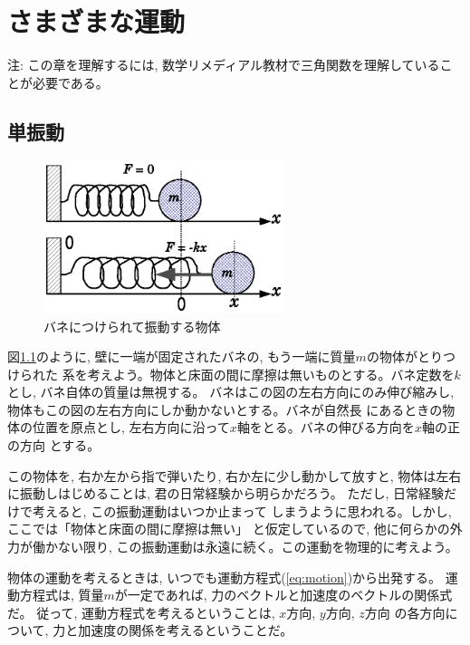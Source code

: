 \chapter{さまざまな運動}

注: この章を理解するには, 数学リメディアル教材で三角関数を理解していることが必要である。\mv

\section{単振動}
\begin{figure}[h]
    \centering
    \includegraphics[width=7cm]{spring_vib.eps}
    \caption{バネにつけられて振動する物体}\label{fig:spring_vib}
\end{figure}

図\ref{fig:spring_vib}のように, 壁に一端が固定されたバネの, もう一端に質量$m$の物体がとりつけられた
系を考えよう。物体と床面の間に摩擦は無いものとする。バネ定数を$k$とし, バネ自体の質量は無視する。
バネはこの図の左右方向にのみ伸び縮みし, 物体もこの図の左右方向にしか動かないとする。バネが自然長
にあるときの物体の位置を原点とし, 左右方向に沿って$x$軸をとる。バネの伸びる方向を$x$軸の正の方向
とする。

この物体を, 右か左から指で弾いたり, 右か左に少し動かして放すと, 
物体は左右に振動しはじめることは, 君の日常経験から明らかだろう。
ただし, 日常経験だけで考えると, この振動運動はいつか止まって
しまうように思われる。しかし, ここでは「物体と床面の間に摩擦は無い」
と仮定しているので, 他に何らかの外力が働かない限り, 
この振動運動は永遠に続く。この運動を物理的に考えよう。

物体の運動を考えるときは, いつでも運動方程式(\ref{eq:motion})から出発する。
運動方程式は, 質量$m$が一定であれば, 力のベクトルと加速度のベクトルの関係式だ。
従って, 運動方程式を考えるということは, $x$方向, $y$方向, $z$方向
の各方向について, 力と加速度の関係を考えるということだ。

